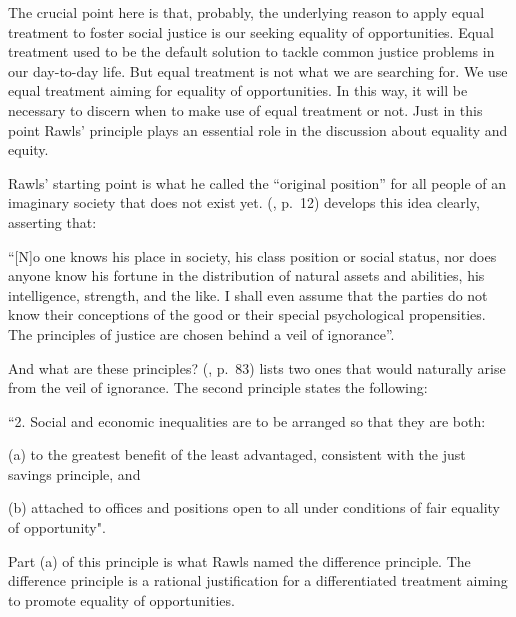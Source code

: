 The crucial point here is that, probably, the underlying reason to apply equal treatment to foster social justice is our seeking equality of opportunities. Equal treatment used to be the default solution to tackle common justice problems in our day-to-day life. But equal treatment is not what we are searching for. We use equal treatment aiming for equality of opportunities. In this way, it will be necessary to discern when to make use of equal treatment or not. Just in this point Rawls' principle plays an essential role in the discussion about equality and equity.

Rawls' starting point is what he called the “original position” for all people of an imaginary society that does not exist yet.  (\citeyear{rawls:1971}, p.~12) develops this idea clearly, asserting that:
\begin{citacao}
    “[N]o one knows his place in society, his class position or social status, nor does anyone know his fortune in the distribution of natural assets and abilities, his intelligence, strength, and the like. I shall even assume that the parties do not know their conceptions of the good or their special psychological propensities. The principles of justice are chosen behind a veil of ignorance”.    
\end{citacao}

And what are these principles?  (\citeyear{rawls:1971}, p.~83) lists two ones that would naturally arise from the veil of ignorance. The second principle states the following:
\begin{citacao}
    “2. Social and economic inequalities are to be arranged so that they are both:
    
    \hspace{0.5cm} (a) to the greatest benefit of the least advantaged, consistent with the just savings principle, and
    
    \hspace{0.5cm} (b) attached to offices and positions open to all under conditions of fair equality of opportunity".
\end{citacao}
 
Part (a) of this principle is what Rawls named the difference principle. The difference principle is a rational justification for a differentiated treatment aiming to promote equality of opportunities.


